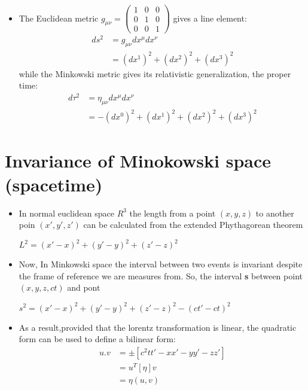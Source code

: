 \documentclass{beamer}
\begin{document}
 
 \begin{frame}
 \begin{itemize}
 \item The Euclidean metric $g_{\mu \nu}=\begin{pmatrix}
1&0&0\\
0&1&0\\
0&0&1
\end{pmatrix}$ gives a line element:
\begin{align*} 
ds^2&=g_{\mu \nu}d x^{\mu} d x^{\nu}\\
&=(dx^1)^2+(dx^2)^2+(dx^3)^2
\end{align*}
while the Minkowski metric gives its relativistic generalization, the proper time:\\
\begin{align*}
d\tau^2&=\eta_{\mu \nu} d x^\mu d x^\nu\\
&=-(dx^0)^2+(dx^1)^2+(dx^2)^2+(dx^3)^2
\end{align*}
 \end{itemize}
 \end{frame}
 
\section{Invariance of Minokowski space (spacetime)}
\begin{frame}
\begin{itemize}
\item In normal euclidean space $R^3$ the length from a point $(x,y,z)$ to another poin $(x',y',z')$ can be calculated from the extended Phythagorean theorem
\begin{center} $L^2=(x'-x)^2+(y'-y)^2+(z'-z)^2$
\end{center}
\item Now, In Minkowski space the interval between two events is invariant despite the frame of reference we are measures from.
So, the interval \textbf{s} between point $(x,y,z,ct)$ and pont %
\begin{center}
$s^2=(x'-x)^2+(y'-y)^2+(z'-z)^2-(ct'-ct)^2$
\end{center}
\item As a result,provided that the lorentz transformation is linear, the quadratic form can be used to define a bilinear form:
\begin{align*}
u.v&= \pm[c^2tt'-xx'-yy'-zz']\\
&=u^T[\eta]v\\
&=\eta(u,v)
\end{align*}
\end{itemize}
\end{frame}
\end{document}
